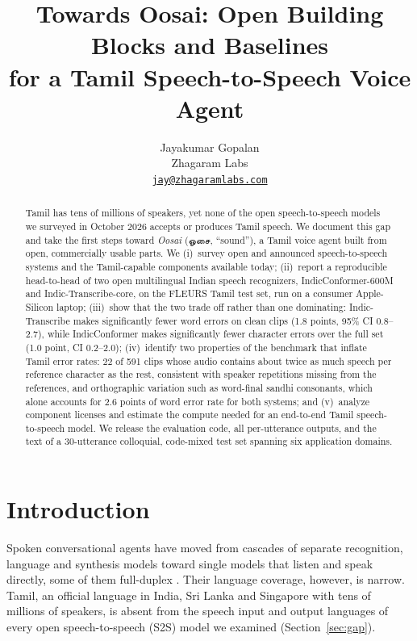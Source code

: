 \documentclass[11pt]{article}
\title{Towards Oosai: Open Building Blocks and Baselines\\for a Tamil Speech-to-Speech Voice Agent}
\author{Jayakumar Gopalan\\Zhagaram Labs\\\href{mailto:jay@zhagaramlabs.com}{\texttt{jay@zhagaramlabs.com}}}
\date{\todo{submission date}}
\newcommand{\ta}[1]{{\tamilfont #1}}
\begin{document}
\maketitle

\begin{abstract}
Tamil has tens of millions of speakers, yet none of the open speech-to-speech models we surveyed in
October 2026 accepts or produces Tamil speech. We document this gap and take the first steps
toward \emph{Oosai} (\ta{ஓசை}, ``sound''), a Tamil voice agent built from open, commercially usable
parts. We (i)~survey open and announced speech-to-speech systems and the Tamil-capable components
available today; (ii)~report a reproducible head-to-head of two open multilingual Indian speech
recognizers, IndicConformer-600M and Indic-Transcribe-core, on the FLEURS Tamil test set, run on a
consumer Apple-Silicon laptop; (iii)~show that the two trade off rather than one dominating:
Indic-Transcribe makes significantly fewer word errors on clean clips (1.8 points, 95\% CI
0.8--2.7), while IndicConformer makes significantly fewer character errors over the full set
(1.0 point, CI 0.2--2.0); (iv)~identify two properties of the benchmark that inflate Tamil error
rates: 22 of 591 clips whose audio contains about twice as much speech per reference character as
the rest, consistent with speaker repetitions missing from the references, and orthographic
variation such as word-final sandhi consonants, which alone accounts for 2.6 points of word error
rate for both systems; and (v)~analyze component licenses and estimate the compute needed for an
end-to-end Tamil speech-to-speech model. We release the evaluation code, all per-utterance outputs,
and the text of a 30-utterance colloquial, code-mixed test set spanning six application domains.
\end{abstract}

\section{Introduction}

Spoken conversational agents have moved from cascades of separate recognition, language and
synthesis models toward single models that listen and speak directly, some of them full-duplex
\citep{defossez2024moshi,fang2024llamaomni,wang2024freezeomni,xu2025qwen3omni,cui2026minicpmo}.
Their language coverage, however, is narrow. Tamil, an official language in India, Sri Lanka and
Singapore with tens of millions of speakers, is absent from the speech input and output languages
of every open speech-to-speech (S2S) model we examined (Section~\ref{sec:gap}).
\end{document}
